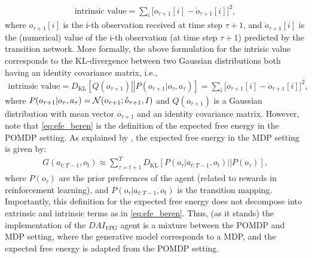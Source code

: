 \documentclass[twoside,11pt]{article}
\let\oldmathcal\mathcal
\renewcommand{\mathcal}[1]{%
  \IfSubStr{ABCDEFGHIJKLMNOPQRSTUVWXYZ}{#1}{\oldmathcal{#1}}{\mathdutchcal{#1}}
}
\newcommand{\kl}[2]{D_{\mathrm{KL}} \left[ \left. \left. #1 \right|\right| #2 \right] }
\begin{document}
\begin{align}
\text{intrinsic value} = \sum_{i} \Big[ o_{\tau+1}[i] - \mathring{o}_{\tau+1}[i] \Big]^2, \label{eq:intrisic_values}
\end{align}
where $o_{\tau+1}[i]$ is the i-th observation received at time step $\tau + 1$, and $\mathring{o}_{\tau+1}[i]$ is the (numerical) value of the i-th observation (at time step $\tau + 1$) predicted by the transition network. More formally, the above formulation for the intrisic value corresponds to the KL-divergence between two Gaussian distributions both having an identity covariance matrix, i.e.,
\begin{align*}
\text{intrinsic value} = \kl{Q(o_{\tau+1})}{P(o_{\tau+1}|o_\tau, a_\tau)} = \sum_{i} \Big[ o_{\tau+1}[i] - \mathring{o}_{\tau+1}[i] \Big]^2,
\end{align*}
where $P(o_{\tau+1}|o_\tau, a_\tau) = \mathcal{N}(o_{\tau+1};\mathring{o}_{\tau+1},I)$ and $Q(o_{\tau+1})$ is a Gaussian distribution with mean vector $o_{\tau+1}$ and an identity covariance matrix. However, note that \eqref{eq:efe_beren} is the definition of the expected free energy in the POMDP setting. As explained by \citet{dacosta2020relationship}, the expected free energy in the MDP setting is given by:
\begin{align*}
G(a_{t:T-1},o_t) \approx \sum_{\tau = t+1}^T \kl{P(o_\tau|a_{t:T-1}, o_t)}{P(o_\tau)},
\end{align*}
where $P(o_\tau)$ are the prior preferences of the agent (related to rewards in reinforcement learning), and $P(o_\tau |a_{t:T-1}, o_t)$ is the transition mapping. Importantly, this definition for the expected free energy does not decompose into extrinsic and intrinsic terms as in \eqref{eq:efe_beren}. Thus, (as it stands) the implementation of the $DAI_{VPG}$ agent is a mixture between the POMDP and MDP setting, where the generative model corresponds to a MDP, and the expected free energy is adapted from the POMDP setting.
\end{document}
